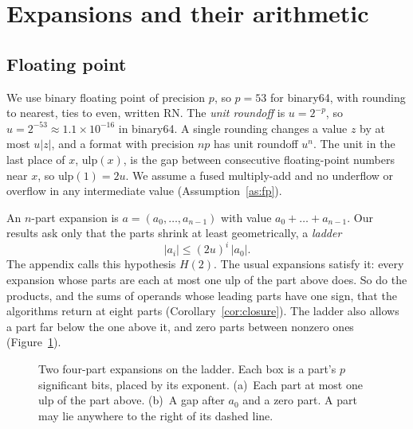 \documentclass[conference]{IEEEtran}
\theoremstyle{definition}
\theoremstyle{remark}
\newcommand{\RN}{\mathrm{RN}}
\newcommand{\ulp}{\mathrm{ulp}}
\begin{document}
\section{Expansions and their arithmetic}

\subsection{Floating point}

We use binary floating point of precision $p$, so $p = 53$ for binary64, with rounding to nearest, ties to even,
written $\RN$. The \emph{unit roundoff} is $u = 2^{-p}$, so $u = 2^{-53} \approx 1.1 \times 10^{-16}$ in binary64. A
single rounding changes a value $z$ by at most $u|z|$, and a format with precision $np$ has unit roundoff $u^n$. The
unit in the last place of $x$, $\ulp(x)$, is the gap between consecutive floating-point numbers near $x$, so $\ulp(1)
= 2u$. We assume a fused multiply-add and no underflow or overflow in any intermediate value
(Assumption~\ref{as:fp}).

An $n$-part expansion is $a = (a_0, \dots, a_{n-1})$ with value $a_0 + \dots + a_{n-1}$. Our results ask only that
the parts shrink at least geometrically, a \emph{ladder}
\[
|a_i| \le (2u)^i\,|a_0|.
\]
The appendix calls this hypothesis $H(2)$. The usual expansions satisfy it: every expansion whose parts are each at
most one ulp of the part above does. So do the products, and the sums of operands whose leading parts have one sign,
that the algorithms return at eight parts (Corollary~\ref{cor:closure}). The ladder also allows a part far below
the one above it, and zero parts between nonzero ones (Figure~\ref{fig:ladder}).

\nopagebreak
\begin{figure}[H]
\centering
{}
\caption{Two four-part expansions on the ladder. Each box is a part's $p$ significant bits, placed by its exponent.
(a)~Each part at most one ulp of the part above. (b)~A gap after $a_0$ and a zero part. A part may lie anywhere to the
right of its dashed line.}
\label{fig:ladder}
\end{figure}
\end{document}
